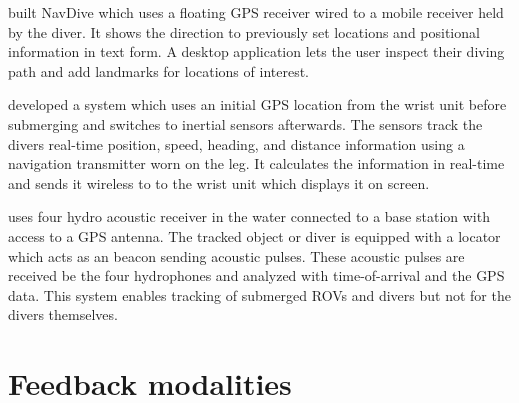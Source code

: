 \cite{navdive} built NavDive which uses a floating GPS receiver wired to a mobile receiver held by the diver. 
It shows the direction to previously set locations and positional information in text form. 
A desktop application lets the user inspect their diving path and add landmarks for locations of interest.

\cite{ariadna} developed a system which uses an initial GPS location from the wrist unit before submerging and switches to  inertial sensors afterwards.
The sensors track the divers real-time position, speed, heading, and distance information using a navigation transmitter worn on the leg.
It calculates the information in real-time and sends it wireless to to the wrist unit which displays it on screen.

\cite{waterlinked} uses four hydro acoustic receiver in the water connected to a base station with access to a GPS antenna. 
The tracked object or diver is equipped with a locator which acts as an beacon sending acoustic pulses. 
These acoustic pulses are received be the four hydrophones and analyzed with time-of-arrival and the GPS data. This system enables tracking of submerged ROVs and divers but not for the divers themselves.

\section{Feedback modalities}


